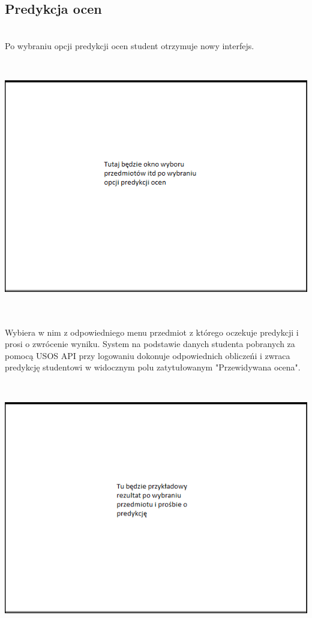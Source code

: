 \documentclass[licencjacka]{pracamgr}
\begin{document}
\subsection{Predykcja ocen}
~\\ \indent
Po wybraniu opcji predykcji ocen student otrzymuje nowy interfejs.  \par
~\\
\begin{minipage}{\linewidth}
	\centering
           \includegraphics[scale=0.7]{przedykcjaocenstart.png}
\end{minipage} \\ \\


Wybiera w nim z odpowiedniego menu przedmiot z którego oczekuje predykcji i prosi o zwrócenie wyniku. System na podstawie danych studenta pobranych za pomocą USOS API przy logowaniu dokonuje odpowiednich obliczeńi i zwraca predykcję studentowi w widocznym polu zatytułowanym "Przewidywana ocena". \\ \par 
 ~\\
\begin{minipage}{\linewidth}
	\centering
           \includegraphics[scale=0.7]{przedykcjaocenresult.png}
\end{minipage} \\ 
\end{document}
